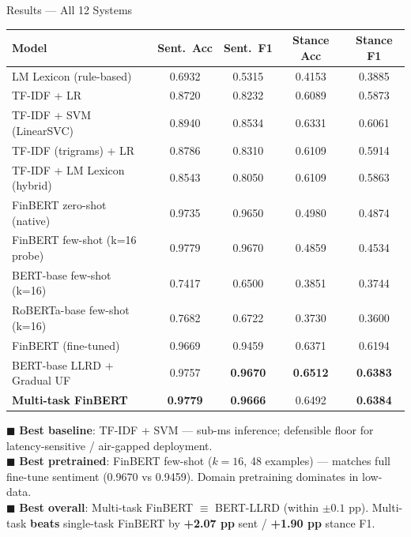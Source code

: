 \documentclass[10pt, aspectratio=169]{beamer}
\begin{document}
\begin{frame}[t]{Results --- All 12 Systems}
    \vspace{-0.4em}
    \centering
    {\footnotesize
    \begin{tabular}{lcccc}
        \toprule
        \textbf{Model} & \textbf{Sent.\ Acc} & \textbf{Sent.\ F1} & \textbf{Stance Acc} & \textbf{Stance F1} \\
        \midrule
        LM Lexicon (rule-based)             & 0.6932 & 0.5315 & 0.4153 & 0.3885 \\
        TF-IDF + LR                         & 0.8720 & 0.8232 & 0.6089 & 0.5873 \\
        \rowcolor{UNSWGreen!25}
        TF-IDF + SVM (LinearSVC)            & 0.8940 & 0.8534 & 0.6331 & 0.6061 \\
        TF-IDF (trigrams) + LR              & 0.8786 & 0.8310 & 0.6109 & 0.5914 \\
        TF-IDF + LM Lexicon (hybrid)        & 0.8543 & 0.8050 & 0.6109 & 0.5863 \\
        \midrule
        FinBERT zero-shot (native)          & 0.9735 & 0.9650 & 0.4980 & 0.4874 \\
        \rowcolor{UNSWRed!20}
        FinBERT few-shot (k=16 probe)       & 0.9779 & 0.9670 & 0.4859 & 0.4534 \\
        BERT-base few-shot (k=16)           & 0.7417 & 0.6500 & 0.3851 & 0.3744 \\
        RoBERTa-base few-shot (k=16)        & 0.7682 & 0.6722 & 0.3730 & 0.3600 \\
        \midrule
        FinBERT (fine-tuned)                & 0.9669 & 0.9459 & 0.6371 & 0.6194 \\
        \rowcolor{UNSWYellow!40}
        BERT-base LLRD + Gradual UF         & 0.9757 & \textbf{0.9670} & \textbf{0.6512} & \textbf{0.6383} \\
        \rowcolor{UNSWYellow!40}
        \textbf{Multi-task FinBERT}         & \textbf{0.9779} & \textbf{0.9666} & 0.6492 & \textbf{0.6384} \\
        \bottomrule
    \end{tabular}}
    \vspace{0.4em}
    \begin{minipage}{0.95\textwidth}
    \centering
    {\footnotesize
    \textcolor{UNSWGreen}{$\blacksquare$} \textbf{Best baseline}: TF-IDF + SVM --- sub-ms inference; defensible floor for latency-sensitive / air-gapped deployment.\\
    \textcolor{UNSWRed}{$\blacksquare$} \textbf{Best pretrained}: FinBERT few-shot ($k{=}16$, 48 examples) --- matches full fine-tune sentiment (0.9670 vs 0.9459). Domain pretraining dominates in low-data.\\
    \textcolor{UNSWYellow!70!black}{$\blacksquare$} \textbf{Best overall}: Multi-task FinBERT $\equiv$ BERT-LLRD (within $\pm 0.1$ pp). Multi-task \textbf{beats} single-task FinBERT by \textbf{+2.07 pp} sent / \textbf{+1.90 pp} stance F1.}
    \end{minipage}
\end{frame}
\end{document}
